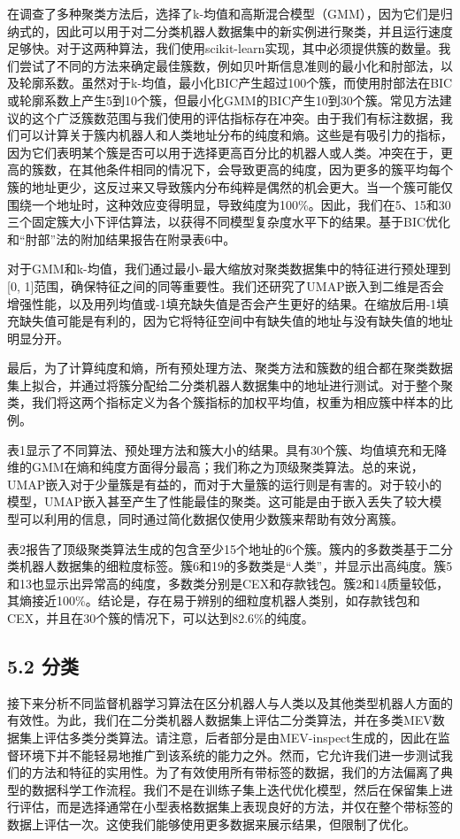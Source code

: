 在调查了多种聚类方法后，选择了k-均值和高斯混合模型（GMM），因为它们是归纳式的，因此可以用于对二分类机器人数据集中的新实例进行聚类，并且运行速度足够快。对于这两种算法，我们使用scikit-learn实现，其中必须提供簇的数量。我们尝试了不同的方法来确定最佳簇数，例如贝叶斯信息准则的最小化和肘部法，以及轮廓系数。虽然对于k-均值，最小化BIC产生超过100个簇，而使用肘部法在BIC或轮廓系数上产生5到10个簇，但最小化GMM的BIC产生10到30个簇。常见方法建议的这个广泛簇数范围与我们使用的评估指标存在冲突。由于我们有标注数据，我们可以计算关于簇内机器人和人类地址分布的纯度和熵。这些是有吸引力的指标，因为它们表明某个簇是否可以用于选择更高百分比的机器人或人类。冲突在于，更高的簇数，在其他条件相同的情况下，会导致更高的纯度，因为更多的簇平均每个簇的地址更少，这反过来又导致簇内分布纯粹是偶然的机会更大。当一个簇可能仅围绕一个地址时，这种效应变得明显，导致纯度为100\%。因此，我们在5、15和30三个固定簇大小下评估算法，以获得不同模型复杂度水平下的结果。基于BIC优化和“肘部”法的附加结果报告在附录表6中。

对于GMM和k-均值，我们通过最小-最大缩放对聚类数据集中的特征进行预处理到[0, 1]范围，确保特征之间的同等重要性。我们还研究了UMAP嵌入到二维是否会增强性能，以及用列均值或-1填充缺失值是否会产生更好的结果。在缩放后用-1填充缺失值可能是有利的，因为它将特征空间中有缺失值的地址与没有缺失值的地址明显分开。

最后，为了计算纯度和熵，所有预处理方法、聚类方法和簇数的组合都在聚类数据集上拟合，并通过将簇分配给二分类机器人数据集中的地址进行测试。对于整个聚类，我们将这两个指标定义为各个簇指标的加权平均值，权重为相应簇中样本的比例。

表1显示了不同算法、预处理方法和簇大小的结果。具有30个簇、均值填充和无降维的GMM在熵和纯度方面得分最高；我们称之为顶级聚类算法。总的来说，UMAP嵌入对于少量簇是有益的，而对于大量簇的运行则是有害的。对于较小的模型，UMAP嵌入甚至产生了性能最佳的聚类。这可能是由于嵌入丢失了较大模型可以利用的信息，同时通过简化数据仅使用少数簇来帮助有效分离簇。

表2报告了顶级聚类算法生成的包含至少15个地址的6个簇。簇内的多数类基于二分类机器人数据集的细粒度标签。簇6和19的多数类是“人类”，并显示出高纯度。簇5和13也显示出异常高的纯度，多数类分别是CEX和存款钱包。簇2和14质量较低，其熵接近100\%。结论是，存在易于辨别的细粒度机器人类别，如存款钱包和CEX，并且在30个簇的情况下，可以达到82.6\%的纯度。

\subsection*{5.2 分类}

接下来分析不同监督机器学习算法在区分机器人与人类以及其他类型机器人方面的有效性。为此，我们在二分类机器人数据集上评估二分类算法，并在多类MEV数据集上评估多类分类算法。请注意，后者部分是由MEV-inspect生成的，因此在监督环境下并不能轻易地推广到该系统的能力之外。然而，它允许我们进一步测试我们的方法和特征的实用性。为了有效使用所有带标签的数据，我们的方法偏离了典型的数据科学工作流程。我们不是在训练子集上迭代优化模型，然后在保留集上进行评估，而是选择通常在小型表格数据集上表现良好的方法，并仅在整个带标签的数据上评估一次。这使我们能够使用更多数据来展示结果，但限制了优化。

